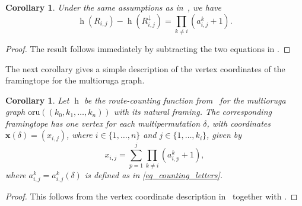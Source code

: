 \documentclass[12pt, reqno]{amsart}
\newcommand{\h}{\operatorname{h}}
\theoremstyle{plain}
\newtheorem{corollary}[theorem]{Corollary}
\theoremstyle{definition}
\numberwithin{equation}{section}
\newcommand{\oru}[1]{\mathrm{oru}(#1)}
\begin{document}
\begin{corollary}\label{cor_h_difference_multioruga}
Under the same assumptions as in~, we have
\[
\h(R_{i,j})-\h(R_{i,j}^{\downarrow})
=
\prod_{k\neq i}(a_{i,j}^k+1).
\]
\end{corollary}

\begin{proof}
The result follows immediately by subtracting the two equations in .
\end{proof}

The next corollary gives a simple description of the vertex coordinates of the framingtope for the multioruga graph.

\begin{corollary}\label{cor_multioruga_coordinates}
Let $\h$ be the route-counting function from~ for the multioruga graph $\oru{(k_0,k_1,\dots,k_n)}$ with its natural framing. The corresponding framingtope has one vertex for each multipermutation $\delta$, with coordinates $\mathbf{x}(\delta)=(x_{i,j})$, where $i\in\{1,\dots,n\}$ and $j\in\{1,\dots,k_i\}$, given by
\[
x_{i,j}
=
\sum_{p=1}^{j}
\prod_{k\neq i}(a_{i,p}^k+1),
\]
where $a_{i,j}^k=a_{i,j}^k(\delta)$ is defined as in \eqref{eq_counting_letters}.
\end{corollary}

\begin{proof}
This follows from the vertex coordinate description in~ together with .
\end{proof}
\end{document}
